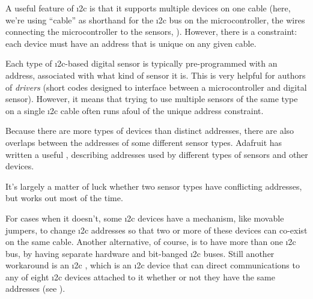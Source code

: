 A useful feature of \i2c is that it supports multiple devices on one cable (here, we're using ``cable'' as shorthand for the \i2c bus on the microcontroller, the wires connecting the microcontroller to the sensors, \etc).
However, there is a constraint: each device must have an address that is unique on any given cable.

Each type of \i2c-based digital sensor is typically pre-programmed with an address, associated with what kind of sensor it is.
This is very helpful for authors of \emph{drivers} (short codes designed to interface between a microcontroller and digital sensor).
However, it means that trying to use multiple sensors of the same type on a single \i2c cable often runs afoul of the unique address constraint.

Because there are more types of devices than distinct addresses, there are also overlaps between the addresses of some different sensor types.
Adafruit has written a useful , describing addresses used by different types of sensors and other devices.

It's largely a matter of luck whether two sensor types have conflicting addresses, but works out most of the time.

For cases when it doesn't, some \i2c devices have a mechanism, like movable jumpers, to change \i2c addresses so that two or more of these devices can co-exist on the same cable.
Another alternative, of course, is to have more than one \i2c bus, \eg by having separate hardware and bit-banged \i2c buses.
Still another workaround is an \i2c , which is an \i2c device that can direct communications to any of eight \i2c devices attached to it whether or  not they have the same addresses (see ).

